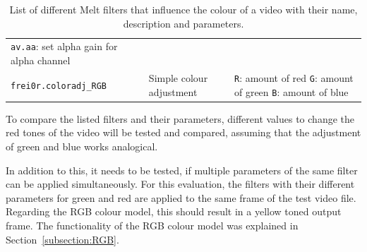 \documentclass[../MasterThesis.tex]{subfiles}
\begin{document}
\begin{table}[H]
\begin{tabular}{lp{4.4cm}p{4.5cm}}
{		\texttt{av.aa}: set alpha gain for alpha channel}
		\\
		\texttt{frei0r.coloradj\_RGB} & Simple colour adjustment & 
		\tiny{
		\texttt{R}: amount of red \newline 
		\texttt{G}: amount of green \newline 
		\texttt{B}: amount of blue}
		\\
		\bottomrule
	\end{tabular}
	\caption[List of Melt filters that influence the colour of a video.]{List of different Melt filters that influence the colour of a video with their name, description and parameters.}
	\label{table:filter}
\end{table}






%


To compare the listed filters and their parameters, different values to change the red tones of the video will be tested and compared, assuming that the adjustment of green and blue works analogical.

In addition to this, it needs to be tested, if multiple parameters of the same filter can be applied simultaneously. For this evaluation, the filters with their different parameters for green and red are applied to the same frame of the test video file. Regarding the RGB colour model, this should result in a yellow toned output frame. The functionality of the RGB colour model was explained in Section~\ref{subsection:RGB}. 
\end{document}
